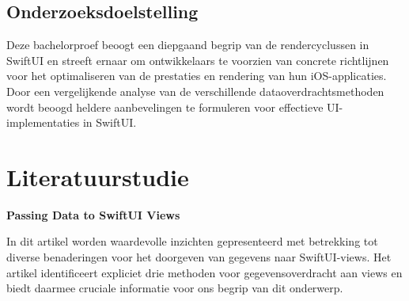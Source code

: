 \subsection{Onderzoeksdoelstelling}
Deze bachelorproef beoogt een diepgaand begrip van de rendercyclussen in SwiftUI en streeft ernaar om ontwikkelaars te voorzien van concrete richtlijnen voor het optimaliseren van de prestaties en rendering van hun iOS-applicaties. Door een vergelijkende analyse van de verschillende dataoverdrachtsmethoden wordt beoogd heldere aanbevelingen te formuleren voor effectieve UI-implementaties in SwiftUI.



\section{Literatuurstudie}%
\label{sec:state-of-the-art}


\textbf{Passing Data to SwiftUI Views~\autocite{SwiftDevJournal}}

In dit artikel worden waardevolle inzichten gepresenteerd met betrekking tot diverse benaderingen voor het doorgeven van gegevens naar SwiftUI-views. Het artikel identificeert expliciet drie methoden voor gegevensoverdracht aan views en biedt daarmee cruciale informatie voor ons begrip van dit onderwerp.

